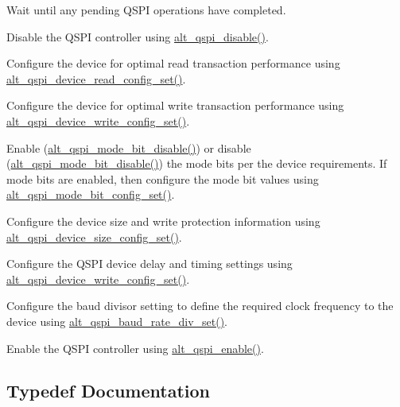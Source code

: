 \begin{DoxyItemize}
\item Wait until any pending Q\+S\+PI operations have completed.
\item Disable the Q\+S\+PI controller using \mbox{\hyperlink{group__ALT__QSPI__CSR_ga22df5a849bd115eef330974c03734fc1}{alt\+\_\+qspi\+\_\+disable()}}.
\item Configure the device for optimal read transaction performance using \mbox{\hyperlink{group__ALT__QSPI__DEV__CFG_gaf6a82874a4199a30a940ac23a84d12d6}{alt\+\_\+qspi\+\_\+device\+\_\+read\+\_\+config\+\_\+set()}}.
\item Configure the device for optimal write transaction performance using \mbox{\hyperlink{group__ALT__QSPI__DEV__CFG_gafc72bb52ae38dbe7a9260c730d96428a}{alt\+\_\+qspi\+\_\+device\+\_\+write\+\_\+config\+\_\+set()}}.
\item Enable (\mbox{\hyperlink{group__ALT__QSPI__DEV__CFG_gab73dc90410cd0b88c97e836b68cfcd11}{alt\+\_\+qspi\+\_\+mode\+\_\+bit\+\_\+disable()}}) or disable (\mbox{\hyperlink{group__ALT__QSPI__DEV__CFG_gab73dc90410cd0b88c97e836b68cfcd11}{alt\+\_\+qspi\+\_\+mode\+\_\+bit\+\_\+disable()}}) the mode bits per the device requirements. If mode bits are enabled, then configure the mode bit values using \mbox{\hyperlink{group__ALT__QSPI__DEV__CFG_gada3ca0ace7fbbf8bd1ea1ce2ad9dada0}{alt\+\_\+qspi\+\_\+mode\+\_\+bit\+\_\+config\+\_\+set()}}.
\item Configure the device size and write protection information using \mbox{\hyperlink{group__ALT__QSPI__DEV__CFG_ga80c5f6f70f44a4ddf9f4766b0f643b10}{alt\+\_\+qspi\+\_\+device\+\_\+size\+\_\+config\+\_\+set()}}.
\item Configure the Q\+S\+PI device delay and timing settings using \mbox{\hyperlink{group__ALT__QSPI__DEV__CFG_gafc72bb52ae38dbe7a9260c730d96428a}{alt\+\_\+qspi\+\_\+device\+\_\+write\+\_\+config\+\_\+set()}}.
\item Configure the baud divisor setting to define the required clock frequency to the device using \mbox{\hyperlink{group__ALT__QSPI__DEV__CFG_ga964033a111f879c5ddfab32cfec0b5f6}{alt\+\_\+qspi\+\_\+baud\+\_\+rate\+\_\+div\+\_\+set()}}.
\item Enable the Q\+S\+PI controller using \mbox{\hyperlink{group__ALT__QSPI__CSR_ga68501b9717901e2d160297a802728772}{alt\+\_\+qspi\+\_\+enable()}}. 
\end{DoxyItemize}

\subsection{Typedef Documentation}
\mbox{\label{group__ALT__QSPI__DEV__CFG_ga5a183c627f4dc5f1469a227c748b01ec}} 
